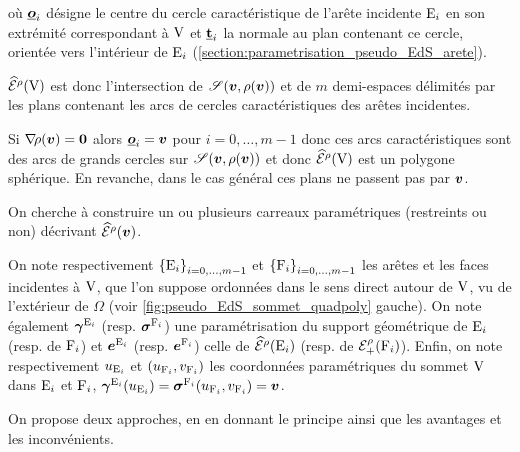 où $\underline{\bm{o}}_i$ désigne le centre du cercle caractéristique de l'arête incidente $\mathrm{E}_i$ en son extrémité correspondant à $\mathrm{V}$ et $\underline{\mathbf{t}}_i$ la normale au plan contenant ce cercle, orientée vers l'intérieur de $\mathrm{E}_i$ (\cf \autoref{section:parametrisation_pseudo_EdS_arete}).
\par
$\pseudoEdS{\brepvertex}{\rho}$ est donc l'intersection de $\sphere[\v][\rho(\v)]$ et de $m$ demi-espaces délimités par les plans contenant les arcs de cercles caractéristiques des arêtes incidentes.
\par
Si $\nabla \! {\rho}(\bm{v}) = \bm{0}$ alors $\underline{\bm{o}}_i = \bm{v}$  pour $i = 0, \ldots, m-1$ donc ces arcs caractéristiques sont des arcs de grands cercles sur $\sphere[\v][\rho(\v)]$ et donc $\pseudoEdS{\brepvertex}{\rho}$ est un polygone sphérique. 
En revanche, dans le cas général ces plans ne passent pas par $\bm{v}$.
\par
On cherche à construire un ou plusieurs carreaux paramétriques (restreints ou non) décrivant $\pseudoEdS{\v}{\rho}$.
\par
On note respectivement $\left\{{\mathrm{E}}_{i}\right\}_{{i}={0},\ldots,{m-1}}$ et $\left\{{\mathrm{F}}_{i}\right\}_{{i}={0},\ldots,{m-1}}$ les arêtes et les faces incidentes à $\mathrm{V}$, que l'on suppose ordonnées dans le sens direct autour de $\mathrm{V}$, vu de l'extérieur de $\Omega$ (voir \autoref{fig:pseudo_EdS_sommet_quadpoly} gauche). 
On note également $\bm{\gamma}^{\mathrm{E}_i}$ (resp. $\bm{\sigma}^{\mathrm{F}_i}$) une paramétrisation du support géométrique de $\mathrm{E}_i$ (resp. de $\mathrm{F}_i$) et $\bm{e}^{\mathrm{E}_i}$ (resp. $\bm{e}^{\mathrm{F}_i}$) celle de $\pseudoEdS{\brepedge_i}{\rho}$ (resp. de ${\mathcal{E}}_{+}^{\rho}({\mathrm{F}_i})$).
Enfin, on note respectivement $u_{\mathrm{E}_i}$ et $(u_{\mathrm{F}_i}, v_{\mathrm{F}_i})$ les coordonnées paramétriques du sommet $\mathrm{V}$ dans $\mathrm{E}_i$ et $\mathrm{F}_i$, \ie $\bm{\gamma}^{\mathrm{E}_i}(u_{\mathrm{E}_i}) = \bm{\sigma}^{\mathrm{F}_i}(u_{\mathrm{F}_i}, v_{\mathrm{F}_i}) = \bm{v}$.
\par
On propose deux approches, en en donnant le principe ainsi que les avantages et les inconvénients.

